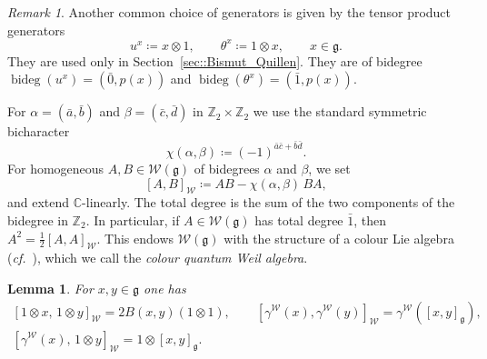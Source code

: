 \documentclass[11pt]{amsart}
\def\WW{{\mathcal{W}}}
\def\Weil{{\mathcal{W}(\gg)}}
\def\CC{{\mathbb C}}
\def\bideg{{\operatorname{bideg}}}
\def\gg{{\mathfrak{g}}}
\def\ZZ{{\mathbb Z}}
\theoremstyle{plain}
\newtheorem{lemma}[theorem]{Lemma}
\theoremstyle{remark}
\theoremstyle{definition}
\numberwithin{equation}{section}
\theoremstyle{remark}
\newtheorem{remark}[theorem]{Remark}
\begin{document}
\begin{remark}\label{rmk::TP_generators_QW} Another common choice of generators is given by the tensor product generators
\begin{equation*}
u^{x}\coloneqq x\otimes 1, \qquad \theta^{x}\coloneqq 1\otimes x, \qquad x \in \gg.
\end{equation*}
They are used only in Section~\ref{sec::Bismut_Quillen}. They are of bidegree $\bideg(u^{x})=(\bar{0},p(x))$ and $\bideg(\theta^{x})=(\bar{1},p(x))$.
\end{remark}


For $\alpha=(\bar a,\bar b)$ and $\beta=(\bar c,\bar d)$ in
$\ZZ_{2}\times\ZZ_{2}$ we use the standard symmetric bicharacter
\begin{equation}
\chi(\alpha,\beta)\coloneqq (-1)^{\bar a\bar c+\bar b\bar d}.
\end{equation}
For homogeneous $A,B\in\Weil$ of bidegrees $\alpha$ and $\beta$, we set
\begin{equation} \label{eq::colour_commutator}
[A,B]_{\WW}\coloneqq AB-\chi(\alpha,\beta)\,BA,
\end{equation}
and extend $\CC$-linearly. The total degree is the sum of the two components of the bidegree in $\ZZ_{2}$. In particular, if $A\in\Weil$ has total degree
$\bar 1$, then $A^{2}=\tfrac12[A,A]_{\WW}$. This endows $\Weil$ with the structure of a colour Lie algebra (\emph{cf.}~\cite{Ree}), which we call the \emph{colour quantum Weil algebra}.


\begin{lemma}\label{lemm::commutation_relations_Weil_generators}
For $x,y\in\gg$ one has
\[
\begin{gathered}
[1\otimes x,\,1\otimes y]_{\WW}=2B(x,y)(1\otimes 1),\qquad
[\gamma^{\WW}(x),\gamma^{\WW}(y)]_{\WW}=\gamma^{\WW}([x,y]_{\gg}),\\
[\gamma^{\WW}(x),\,1\otimes y]_{\WW}=1\otimes [x,y]_{\gg}.
\end{gathered}
\]
\end{lemma}
\end{document}
